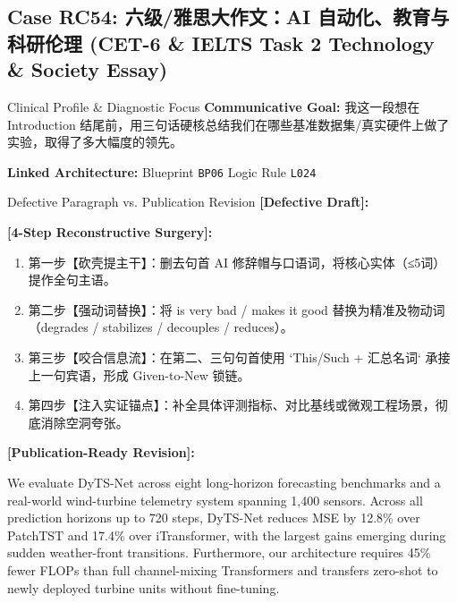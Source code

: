 \subsection{Case RC54: 六级/雅思大作文：AI 自动化、教育与科研伦理 (CET-6 \& IELTS Task 2 Technology \& Society Essay)}\label{case:RC54}
\begin{ConceptBox}{Clinical Profile \& Diagnostic Focus}
\textbf{Communicative Goal:} 我这一段想在 Introduction 结尾前，用三句话硬核总结我们在哪些基准数据集/真实硬件上做了实验，取得了多大幅度的领先。\par
\textbf{Linked Architecture:} Blueprint \texttt{BP06} \enspace\textbar\enspace Logic Rule \texttt{L024}
\end{ConceptBox}
\begin{ExampleBox}{Defective Paragraph vs. Publication Revision}
\textbf{\color{TargetHighlight}[Defective Draft]:}\par
{}\par\vspace{6pt}
\textbf{\color{AcadForest}[4-Step Reconstructive Surgery]:}
\begin{enumerate}[label=\textbf{\color{AcadNavy}Step \arabic*:}, leftmargin=2em]
  \item 第一步【砍壳提主干】：删去句首 AI 修辞帽与口语词，将核心实体（≤5词）提作全句主语。
  \item 第二步【强动词替换】：将 is very bad / makes it good 替换为精准及物动词（degrades / stabilizes / decouples / reduces）。
  \item 第三步【咬合信息流】：在第二、三句句首使用 `This/Such + 汇总名词` 承接上一句宾语，形成 Given-to-New 锁链。
  \item 第四步【注入实证锚点】：补全具体评测指标、对比基线或微观工程场景，彻底消除空洞夸张。
\end{enumerate}\vspace{4pt}
\textbf{\color{AcadNavy}[Publication-Ready Revision]:}\par
We evaluate DyTS-Net across eight long-horizon forecasting benchmarks and a real-world wind-turbine telemetry system spanning 1,400 sensors. Across all prediction horizons up to 720 steps, DyTS-Net reduces MSE by 12.8\% over PatchTST and 17.4\% over iTransformer, with the largest gains emerging during sudden weather-front transitions. Furthermore, our architecture requires 45\% fewer FLOPs than full channel-mixing Transformers and transfers zero-shot to newly deployed turbine units without fine-tuning.
\end{ExampleBox}
